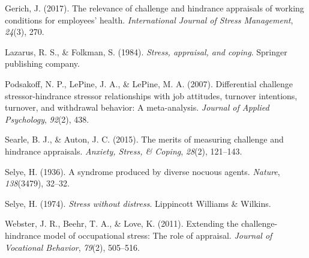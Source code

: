 \documentclass[
  man]{apa6}
\newlength{\cslhangindent}
\newlength{\cslentryspacingunit} %
\newenvironment{CSLReferences}[2] %
 {%
  \setlength{\parindent}{0pt}
  \ifodd #1
  \let\oldpar\par
  \def\par{\hangindent=\cslhangindent\oldpar}
  \fi
  \setlength{\parskip}{#2\cslentryspacingunit}
 }%
 {}
\begin{document}
\begin{CSLReferences}{1}{0}
\leavevmode{}%
Gerich, J. (2017). The relevance of challenge and hindrance appraisals of working conditions for employees' health. \emph{International Journal of Stress Management}, \emph{24}(3), 270.

\leavevmode{}%
Lazarus, R. S., \& Folkman, S. (1984). \emph{Stress, appraisal, and coping}. Springer publishing company.

\leavevmode{}%
Podsakoff, N. P., LePine, J. A., \& LePine, M. A. (2007). Differential challenge stressor-hindrance stressor relationships with job attitudes, turnover intentions, turnover, and withdrawal behavior: A meta-analysis. \emph{Journal of Applied Psychology}, \emph{92}(2), 438.

\leavevmode{}%
Searle, B. J., \& Auton, J. C. (2015). The merits of measuring challenge and hindrance appraisals. \emph{Anxiety, Stress, \& Coping}, \emph{28}(2), 121--143.

\leavevmode{}%
Selye, H. (1936). A syndrome produced by diverse nocuous agents. \emph{Nature}, \emph{138}(3479), 32--32.

\leavevmode{}%
Selye, H. (1974). \emph{Stress without distress}. Lippincott Williams \& Wilkins.

\leavevmode{}%
Webster, J. R., Beehr, T. A., \& Love, K. (2011). Extending the challenge-hindrance model of occupational stress: The role of appraisal. \emph{Journal of Vocational Behavior}, \emph{79}(2), 505--516.

\end{CSLReferences}
\end{document}
